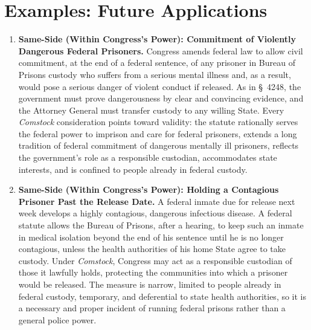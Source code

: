 \documentclass[12pt]{article}
\begin{document}
\section{Examples: Future Applications}
\begin{enumerate}

\item \textbf{Same-Side (Within Congress's Power): Commitment of Violently Dangerous Federal Prisoners.} Congress amends federal law to allow civil commitment, at the end of a federal sentence, of any prisoner in Bureau of Prisons custody who suffers from a serious mental illness and, as a result, would pose a serious danger of violent conduct if released. As in \S~4248, the government must prove dangerousness by clear and convincing evidence, and the Attorney General must transfer custody to any willing State. Every \textit{Comstock} consideration points toward validity: the statute rationally serves the federal power to imprison and care for federal prisoners, extends a long tradition of federal commitment of dangerous mentally ill prisoners, reflects the government's role as a responsible custodian, accommodates state interests, and is confined to people already in federal custody.

\item \textbf{Same-Side (Within Congress's Power): Holding a Contagious Prisoner Past the Release Date.} A federal inmate due for release next week develops a highly contagious, dangerous infectious disease. A federal statute allows the Bureau of Prisons, after a hearing, to keep such an inmate in medical isolation beyond the end of his sentence until he is no longer contagious, unless the health authorities of his home State agree to take custody. Under \textit{Comstock}, Congress may act as a responsible custodian of those it lawfully holds, protecting the communities into which a prisoner would be released. The measure is narrow, limited to people already in federal custody, temporary, and deferential to state health authorities, so it is a necessary and proper incident of running federal prisons rather than a general police power.


\end{enumerate}
\end{document}
